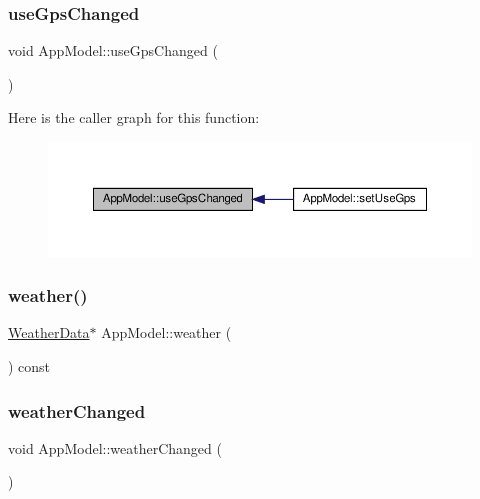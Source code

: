 \mbox{\label{class_app_model_af0007ee4da862433868baa5fdb31a3fe}} 
\subsubsection{\texorpdfstring{use\+Gps\+Changed}{useGpsChanged}}
{\footnotesize\ttfamily void App\+Model\+::use\+Gps\+Changed (\begin{DoxyParamCaption}{ }\end{DoxyParamCaption})\hspace{0.3cm}{\ttfamily [signal]}}

Here is the caller graph for this function\+:\nopagebreak
\begin{figure}[H]
\begin{center}
\leavevmode
\includegraphics[width=350pt]{class_app_model_af0007ee4da862433868baa5fdb31a3fe_icgraph}
\end{center}
\end{figure}
\mbox{\label{class_app_model_a70a5bec8e359e4edbd16611efa96cf32}} 
\subsubsection{\texorpdfstring{weather()}{weather()}}
{\footnotesize\ttfamily \hyperlink{class_weather_data}{Weather\+Data}$\ast$ App\+Model\+::weather (\begin{DoxyParamCaption}{ }\end{DoxyParamCaption}) const}

\mbox{\label{class_app_model_a83e61455ed5672333b0db45f3f86417c}} 
\subsubsection{\texorpdfstring{weather\+Changed}{weatherChanged}}
{\footnotesize\ttfamily void App\+Model\+::weather\+Changed (\begin{DoxyParamCaption}{ }\end{DoxyParamCaption})\hspace{0.3cm}{\ttfamily [signal]}}

